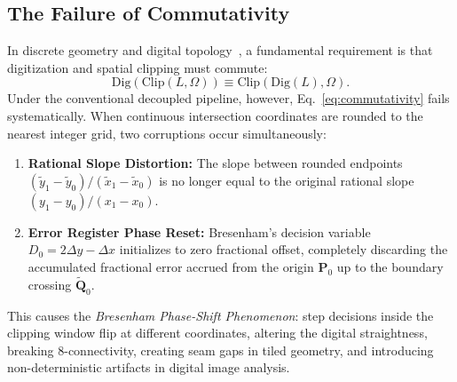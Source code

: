 \documentclass[runningheads]{llncs}
\begin{document}
\subsection{The Failure of Commutativity}
In discrete geometry and digital topology~\cite{reveilles1991geometrie,coeurjolly2004discrete}, a fundamental requirement is that digitization and spatial clipping must commute:
\begin{equation}
    \label{eq:commutativity}
    \mathrm{Dig}(\mathrm{Clip}(L, \Omega)) \equiv \mathrm{Clip}(\mathrm{Dig}(L), \Omega).
\end{equation}
Under the conventional decoupled pipeline, however, Eq.~\eqref{eq:commutativity} fails systematically. When continuous intersection coordinates are rounded to the nearest integer grid, two corruptions occur simultaneously:
\begin{enumerate}
    \item \textbf{Rational Slope Distortion:} The slope between rounded endpoints $(\tilde{y}_1 - \tilde{y}_0) / (\tilde{x}_1 - \tilde{x}_0)$ is no longer equal to the original rational slope $(y_1 - y_0) / (x_1 - x_0)$.
    \item \textbf{Error Register Phase Reset:} Bresenham's decision variable $D_0 = 2\Delta y - \Delta x$ initializes to zero fractional offset, completely discarding the accumulated fractional error accrued from the origin $\mathbf{P}_0$ up to the boundary crossing $\tilde{\mathbf{Q}}_0$.
\end{enumerate}

This causes the \emph{Bresenham Phase-Shift Phenomenon}: step decisions inside the clipping window flip at different coordinates, altering the digital straightness, breaking 8-connectivity, creating seam gaps in tiled geometry, and introducing non-deterministic artifacts in digital image analysis.
\end{document}
